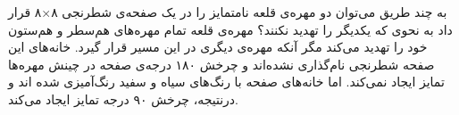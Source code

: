 \p
به چند طریق می‌توان دو مهره‌ی قلعه
نامتمایز را در یک صفحه‌ی شطرنجی ۸×۸ قرار داد به نحوی که یکدیگر را تهدید نکنند؟
مهره‌ی قلعه تمام مهره‌های هم‌سطر و هم‌ستون خود را تهدید می‌کند مگر آنکه مهره‌ی دیگری در
این مسیر قرار گیرد.
خانه‌های این صفحه شطرنجی نام‌گذاری نشده‌اند و چرخش ۱۸۰ درجه‌ی صفحه در چینش مهره‌ها
تمایز ایجاد نمی‌کند. اما خانه‌های صفحه با رنگ‌های سیاه و سفید رنگ‌آمیزی شده اند و
درنتیجه، چرخش ۹۰ درجه تمایز ایجاد می‌کند. 